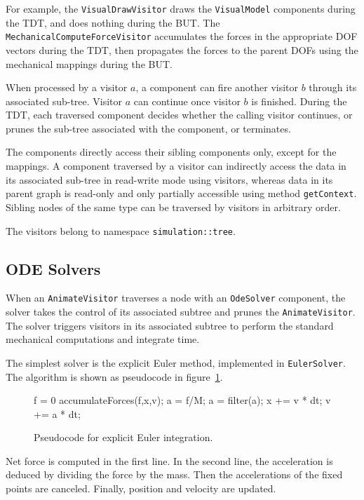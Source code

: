 For example, the \texttt{VisualDrawVisitor} draws the \texttt{VisualModel} components during the TDT, and does nothing during the BUT.
The \texttt{MechanicalComputeForceVisitor} accumulates the forces in the appropriate DOF vectors during the TDT, then propagates the forces to the parent DOFs using the mechanical mappings during the BUT.

When processed by a visitor $a$, a component can fire another visitor $b$ through its associated sub-tree. 
Visitor $a$ can continue once visitor $b$ is finished.
During the TDT, each traversed component decides whether the calling visitor continues, or prunes the sub-tree associated with the component, or terminates.

The components directly access their sibling components only, except for the mappings.
A component traversed by a visitor can indirectly access the data in its associated sub-tree in read-write mode using visitors, whereas data in its parent graph is read-only and only partially accessible using method \texttt{getContext}.
Sibling nodes of the same type can be traversed by visitors in arbitrary order.

The visitors belong to namespace \texttt{simulation::tree}.

\subsection{ODE Solvers}
When an \texttt{AnimateVisitor} traverses a node with an \texttt{OdeSolver} component,
the solver takes the control of its associated subtree and prunes the \texttt{AnimateVisitor}. 
The solver triggers visitors in its associated subtree to perform the standard mechanical computations and integrate time.

The simplest solver is the explicit Euler method, implemented in \texttt{EulerSolver}. 
The algorithm is shown as pseudocode in figure~\ref{pc:expliciteuler}.
\begin{figure}
\begin{code_cpp}
f = 0
accumulateForces(f,x,v);
a = f/M;
a = filter(a);
x += v * dt;
v += a * dt;
\end{code_cpp}
\caption{Pseudocode for explicit Euler integration.}
\label{pc:expliciteuler}
\end{figure}
Net force is computed in the first line.
In the second line, the acceleration is deduced by dividing the force by the mass.
Then the accelerations of the fixed points are canceled.
Finally, position and velocity are updated.

